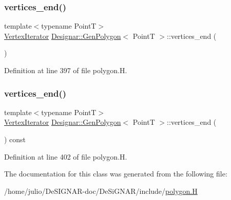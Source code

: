 \subsubsection{\texorpdfstring{vertices\+\_\+end()}{vertices\_end()}\hspace{0.1cm}{\footnotesize\ttfamily [1/2]}}
{\footnotesize\ttfamily template$<$typename PointT$>$ \\
\hyperlink{class_designar_1_1_gen_polygon_1_1_vertex_iterator}{Vertex\+Iterator} \hyperlink{class_designar_1_1_gen_polygon}{Designar\+::\+Gen\+Polygon}$<$ PointT $>$\+::vertices\+\_\+end (\begin{DoxyParamCaption}{ }\end{DoxyParamCaption})\hspace{0.3cm}{\ttfamily [inline]}}



Definition at line 397 of file polygon.\+H.

\mbox{\label{class_designar_1_1_gen_polygon_ad409613d032d91895921d60e27250a14}} 
\subsubsection{\texorpdfstring{vertices\+\_\+end()}{vertices\_end()}\hspace{0.1cm}{\footnotesize\ttfamily [2/2]}}
{\footnotesize\ttfamily template$<$typename PointT$>$ \\
\hyperlink{class_designar_1_1_gen_polygon_1_1_vertex_iterator}{Vertex\+Iterator} \hyperlink{class_designar_1_1_gen_polygon}{Designar\+::\+Gen\+Polygon}$<$ PointT $>$\+::vertices\+\_\+end (\begin{DoxyParamCaption}{ }\end{DoxyParamCaption}) const\hspace{0.3cm}{\ttfamily [inline]}}



Definition at line 402 of file polygon.\+H.



The documentation for this class was generated from the following file\+:\begin{DoxyCompactItemize}
\item 
/home/julio/\+De\+S\+I\+G\+N\+A\+R-\/doc/\+De\+Si\+G\+N\+A\+R/include/\hyperlink{polygon_8_h}{polygon.\+H}\end{DoxyCompactItemize}
